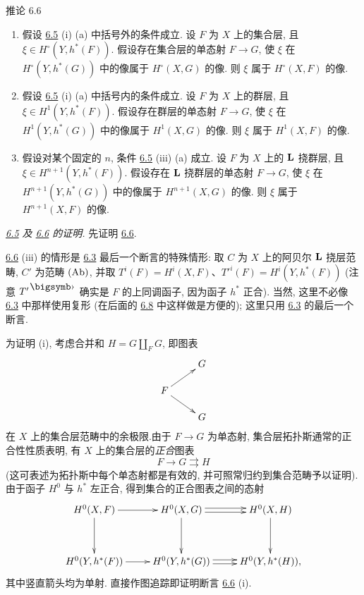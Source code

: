 \begin{enonce*}{推论 6.6}
\begin{enumerate}
\renewcommand{\theenumi}{\roman{enumi}}
\renewcommand{\labelenumi}{(\theenumi)}
\item 假设 \hyperref[XII.prop6.5]{6.5} {\rm (i) (a)} 中括号外的条件成立. 设 $F$ 为 $X$ 上的集合层, 且 $\xi\in H^{\circ}(Y,h^{\ast}(F))$. 假设\pageoriginale 存在集合层的单态射 $F\to G$, 使 $\xi$ 在 $H^{\circ}(Y,h^{\ast}(G))$ 中的像属于 $H^{\circ}(X,G)$ 的像. 则 $\xi$ 属于 $H^{\circ}(X,F)$ 的像.

\item 假设 \hyperref[XII.prop6.5]{6.5} {\rm (i) (a)} 中括号内的条件成立. 设 $F$ 为 $X$ 上的群层, 且 $\xi\in H^1(Y,h^{\ast}(F))$. 假设存在群层的单态射 $F\to G$, 使 $\xi$ 在 $H^1(Y,h^{\ast}(G))$ 中的像属于 $H^1(X,G)$ 的像. 则 $\xi$ 属于 $H^1(X,F)$ 的像.

\item 假设对某个固定的 $n$, 条件 \hyperref[XII.prop6.5]{6.5} {\rm (iii) (a)} 成立. 设 $F$ 为 $X$ 上的 $\mathbf{L}$ 挠群层, 且 $\xi\in H^{n+1}(Y,h^{\ast}(F))$. 假设存在 $\mathbf{L}$ 挠群层的单态射 $F\to G$, 使 $\xi$ 在 $H^{n+1}(Y,h^{\ast}(G))$ 中的像属于 $H^{n+1}(X,G)$ 的像. 则 $\xi$ 属于 $H^{n+1}(X,F)$ 的像.
\end{enumerate}
\end{enonce*}

\noindent
\emph{\hyperref[XII.prop6.5]{6.5} 及 \hyperref[XII.cor6.6]{6.6} 的证明.}
先证明 \hyperref[XII.cor6.6]{6.6}.

\hyperref[XII.cor6.6]{6.6} (iii) 的情形是 \hyperref[XII.cor6.3]{6.3} 最后一个断言的特殊情形: 取 $C$ 为 $X$ 上的阿贝尔 $\mathbf{L}$ 挠层范畴, $C'$ 为范畴 $(\operatorname{Ab})$, 并取 $T^{i}(F)=H^{i}(X,F)$、${T'}^{i}(F)=H^{i}(Y,h^{\ast}(F))$ (注意 $T'^{\bigdot}$ 确实是 $F$ 的上同调函子, 因为函子 $h^{\ast}$ 正合). 当然, 这里不必像 \hyperref[XII.cor6.3]{6.3} 中那样使用复形 (在后面的 \hyperref[XII.prop6.8]{6.8} 中这样做是方便的); 这里只用 \hyperref[XII.cor6.3]{6.3} 的最后一个断言.

为证明 (i), 考虑合并和 $H=G\amalg_F G$, 即图表
$$
\xymatrix@R=.5cm{
  & G\\
F \ar[ru] \ar[rd]&\\
  & G
}
$$
在 $X$ 上的集合层范畴中的余极限.\pageoriginale 由于 $F\rightarrow G$ 为单态射, 集合层拓扑斯通常的正合性性质表明, 有 $X$ 上的集合层的\emph{正合}图表
$$
F\to G\rightrightarrows H
$$
(这可表述为拓扑斯中每个单态射都是有效的, 并可照常归约到集合范畴予以证明). 由于函子 $H^{0}$ 与 $h^{\ast}$ 左正合, 得到集合的正合图表之间的态射
$$
\xymatrix@R=1.25cm{
H^{0}(X,F) \ar[r]\ar[d]& H^{0}(X,G)  \ar[d]\ar@<2pt>[r]\ar@<-2pt>[r]& H^{0}(X,H)\ar[d]\\
H^{0}(Y,h^{\ast}(F)) \ar[r]& H^{0}(Y,h^{\ast}(G)) \ar@<2pt>[r]\ar@<-2pt>[r]& H^{0}(Y,h^{\ast}(H)),
}
$$
其中竖直箭头均为单射. 直接作图追踪即证明断言 \hyperref[XII.cor6.6]{6.6} (i).

